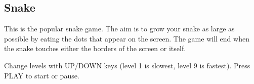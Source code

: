 \subsection{Snake}

This is the popular snake game. The aim is to grow your snake as large
as possible by eating the dots that appear on the screen. The game will
end when the snake touches either the borders of the screen or itself.

Change levels with UP/DOWN keys (level 1 is slowest, level 9 is
fastest). Press PLAY to start or pause. 

